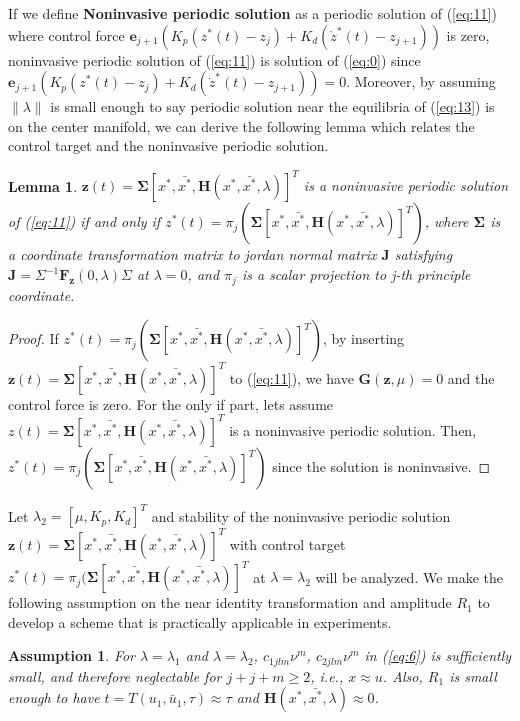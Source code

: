 \documentclass[openacc]{rsproca_new}%
\def\vec#1{\ensuremath{\mathbf{#1}}}
\newcommand{\Eref}[1]{(\ref{#1})}
\newtheorem{lemma}{\bf Lemma}[section]
\newtheorem{assumption}{\bf Assumption}[section]
\begin{document}
\noindent If we define \textbf{Noninvasive periodic solution} as a periodic solution of \Eref{eq:11} where control force $\vec{e}_{j+1}(K_p(z^*(t)-z_j)+K_d(\dot z^*(t)-z_{j+1}))$ is zero, noninvasive periodic solution of \Eref{eq:11} is solution of \Eref{eq:0} since $\vec{e}_{j+1}(K_p(z^*(t)-z_j)+K_d(\dot z^*(t)-z_{j+1}))=0$. Moreover, by assuming $\| \lambda \|$ is small enough to say periodic solution near the equilibria of \Eref{eq:13} is on the center manifold, we can derive the following lemma which relates the control target and the noninvasive periodic solution.

\begin{lemma}\label{l1}
$\vec{z}(t)=\vec{\Sigma}[x^*,\bar {x^*},\vec H(x^*,\bar {x^*},\lambda)]^T$ is a noninvasive periodic solution of \Eref{eq:11} if and only if $z^*(t)=\pi_j (\vec{\Sigma}[x^*,\bar {x^*},\vec H(x^*,\bar {x^*},\lambda)]^T)$,
where $\vec{\Sigma}$ is a coordinate transformation matrix to jordan normal matrix $\vec{J}$ satisfying $\vec{J}=\Sigma^{-1}\vec{F}_\vec{z}(0,\lambda) \Sigma$ at $\lambda=0$, and $\pi_j$ is a scalar projection to j-th principle coordinate.
\end{lemma}

\begin{proof}
If $z^*(t)=\pi_j (\vec{\Sigma}[x^*,\bar {x^*},\vec H(x^*,\bar {x^*},\lambda)]^T)$, by inserting $\vec z(t)=\vec{\Sigma}[x^*,\bar {x^*},\vec H(x^*,\bar {x^*},\lambda)]^T$ to \Eref{eq:11}, we have $\vec{G}(\vec{z},\mu)=0$ and the control force is zero. For the only if part, lets assume $z(t)=\vec{\Sigma}[x^*,\bar {x^*},\vec H(x^*,\bar {x^*},\lambda)]^T$ is a noninvasive periodic solution. Then, $z^*(t)=\pi_j (\vec{\Sigma}[x^*,\bar {x^*},\vec H(x^*,\bar {x^*},\lambda)]^T)$ since the solution is noninvasive.
\end{proof}

\noindent Let $\lambda_2=[\mu,K_p,K_d]^T$ and stability of the noninvasive periodic solution $\vec{z}(t)=\vec{\Sigma}[x^*,\bar {x^*},\vec H(x^*,\bar {x^*},\lambda)]^T$ with control target $z^*(t)=\pi_j (\vec{\Sigma}[x^*,\bar {x^*},\vec H(x^*,\bar {x^*},\lambda)]^T$  at $\lambda=\lambda_2$ will be analyzed. We make the following assumption on the near identity transformation and amplitude $R_1$ to develop a scheme that is practically applicable in experiments.

\begin{assumption}\label{a1}
For $\lambda=\lambda_1$ and $\lambda=\lambda_2$, $c_{1jlm}\nu^m$, $c_{2jlm}\nu^m$ in \Eref{eq:6} is sufficiently small, and therefore neglectable for $j+j+m\geq 2$, i.e., $x \approx u$. Also, $R_1$ is small enough to have $t=T(u_1,\bar u_1,\tau) \approx \tau$ and $\vec H(x^*,\bar {x^*},\lambda) \approx 0$.
\end{assumption}
\end{document}
